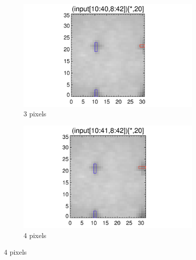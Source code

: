 \documentclass[10pt]{article}
\begin{document}
\begin{figure}[!h]
   \begin{subfigure}[b]{.45\linewidth}
        \centering
        \includegraphics[width=1.3\textwidth]{plots_tables_images/fidcheck_newdegree2.png}
        \caption{3 pixels}
    \end{subfigure}
    \begin{subfigure}[b]{.45\linewidth}
        \centering
        \includegraphics[width=1.3\textwidth]{plots_tables_images/fidcheck_newdegree3.png}
        \caption{4 pixels}
    \end{subfigure}


\end{figure}
\end{document}
